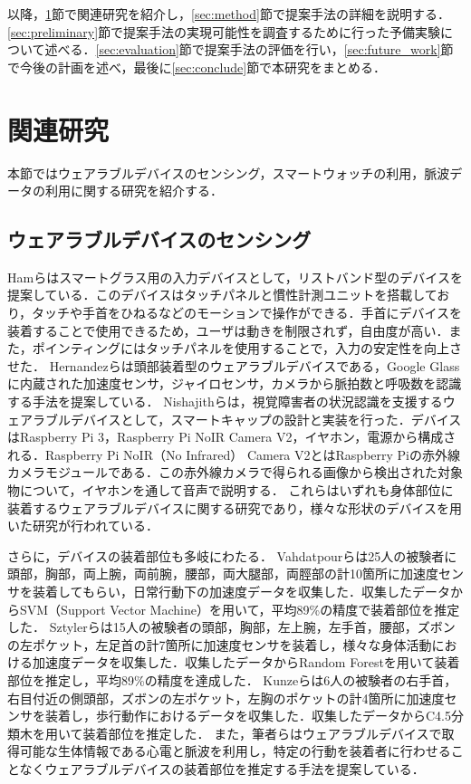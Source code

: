 \documentclass[Japanese,noauthor]{dicomopapers}
\begin{document}
以降，\ref{sec:related}節で関連研究を紹介し，\ref{sec:method}節で提案手法の詳細を説明する．\ref{sec:preliminary}節で提案手法の実現可能性を調査するために行った予備実験について述べる．\ref{sec:evaluation}節で提案手法の評価を行い，\ref{sec:future_work}節で今後の計画を述べ，最後に\ref{sec:conclude}節で本研究をまとめる．



\section{関連研究}
\label{sec:related}
本節ではウェアラブルデバイスのセンシング，スマートウォッチの利用，脈波データの利用に関する研究を紹介する．

\subsection{ウェアラブルデバイスのセンシング}
Hamら\cite{smart_wristband}はスマートグラス用の入力デバイスとして，リストバンド型のデバイスを提案している．このデバイスはタッチパネルと慣性計測ユニットを搭載しており，タッチや手首をひねるなどのモーションで操作ができる．手首にデバイスを装着することで使用できるため，ユーザは動きを制限されず，自由度が高い．また，ポインティングにはタッチパネルを使用することで，入力の安定性を向上させた．
Hernandezら\cite{bioglass}は頭部装着型のウェアラブルデバイスである，Google Glassに内蔵された加速度センサ，ジャイロセンサ，カメラから脈拍数と呼吸数を認識する手法を提案している．
Nishajithら\cite{smart_cap}は，視覚障害者の状況認識を支援するウェアラブルデバイスとして，スマートキャップの設計と実装を行った．デバイスはRaspberry Pi 3，Raspberry Pi NoIR Camera V2，イヤホン，電源から構成される．Raspberry Pi NoIR（No Infrared） Camera V2とはRaspberry Piの赤外線カメラモジュールである．この赤外線カメラで得られる画像から検出された対象物について，イヤホンを通して音声で説明する．
これらはいずれも身体部位に装着するウェアラブルデバイスに関する研究であり，様々な形状のデバイスを用いた研究が行われている．\par

さらに，デバイスの装着部位も多岐にわたる．
Vahdatpourら\cite{localization_vahdatpour}は25人の被験者に頭部，胸部，両上腕，両前腕，腰部，両大腿部，両脛部の計10箇所に加速度センサを装着してもらい，日常行動下の加速度データを収集した．収集したデータからSVM（Support Vector Machine）を用いて，平均89\%の精度で装着部位を推定した．
Sztylerら\cite{localization_sztyler}は15人の被験者の頭部，胸部，左上腕，左手首，腰部，ズボンの左ポケット，左足首の計7箇所に加速度センサを装着し，様々な身体活動における加速度データを収集した．収集したデータからRandom Forestを用いて装着部位を推定し，平均89\%の精度を達成した．
Kunzeら\cite{localization_kunze}は6人の被験者の右手首，右目付近の側頭部，ズボンの左ポケット，左胸のポケットの計4箇所に加速度センサを装着し，歩行動作におけるデータを収集した．収集したデータからC4.5分類木を用いて装着部位を推定した．
また，筆者ら\cite{localization_yoshida}はウェアラブルデバイスで取得可能な生体情報である心電と脈波を利用し，特定の行動を装着者に行わせることなくウェアラブルデバイスの装着部位を推定する手法を提案している．\par
\end{document}
